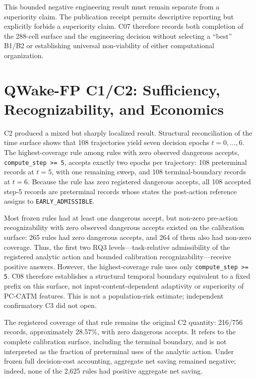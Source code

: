 This bounded negative engineering result must remain separate from a superiority claim.
The publication receipt permits descriptive reporting but explicitly forbids a
superiority claim. C07 therefore records both completion of the 288-cell surface and
the engineering decision without selecting a ``best'' B1/B2 or establishing universal
non-viability of either computational organization.

\section{QWake-FP C1/C2: Sufficiency, Recognizability, and Economics}
\label{sec:results-qwake-en}

C2 produced a mixed but sharply localized result. Structural reconciliation of the
time surface shows that 108 trajectories yield seven decision epochs
\(t=0,\ldots,6\). The highest-coverage rule among rules with zero observed dangerous
accepts, \texttt{compute\_step >= 5}, accepts exactly two epochs per trajectory: 108
preterminal records at \(t=5\), with one remaining sweep, and 108 terminal-boundary
records at \(t=6\). Because the rule has zero registered dangerous accepts, all 108
accepted step-5 records are preterminal records whose states the post-action reference
assigns to \texttt{EARLY\_ADMISSIBLE}.

Most frozen rules had at least one dangerous accept, but non-zero pre-action
recognizability with zero observed dangerous accepts existed on the calibration
surface: 265 rules had zero dangerous accepts, and 264 of them also had non-zero
coverage. Thus, the first two RQ3 levels---task-relative admissibility of the registered
analytic action and bounded calibration recognizability---receive positive answers.
However, the highest-coverage rule uses only \texttt{compute\_step >= 5}. C08 therefore
establishes a structural temporal boundary equivalent to a fixed prefix on this
surface, not input-content-dependent adaptivity or superiority of PC-CATM features.
This is not a population-risk estimate; independent confirmatory C3 did not open.



The registered coverage of that rule remains the original C2 quantity: 216/756 records,
approximately 28.57\%, with zero dangerous accepts. It refers to the complete
calibration surface, including the terminal boundary, and is not interpreted as the
fraction of preterminal uses of the analytic action. Under frozen full decision-cost
accounting, aggregate net saving remained negative; indeed, none of the 2,625 rules had
positive aggregate net saving.

